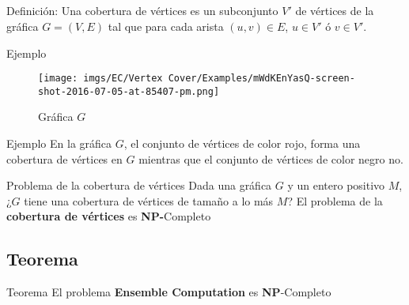 \documentclass[spanish, xcolor=dvipsnames, aspectratio=169]{beamer}
\newcommand{\subsectiontitle}{}
\begin{document}
\subsection{\subsectiontitle}
\begin{frame}{\subsectiontitle}
Definición:
\newline
Una cobertura de vértices es un subconjunto \(V'\) de vértices de la gráfica \(G = \left(V, E\right) \) tal que para cada 
arista \( \left(u, v\right) \in E \), \(u \in V'\) ó \(v \in V'\).
\end{frame}
\begin{frame}{Ejemplo}
    \begin{figure}
        \centering
        \texttt{[image: imgs/EC/Vertex Cover/Examples/mWdKEnYasQ-screen-shot-2016-07-05-at-85407-pm.png]}
        \caption{Gráfica \( G \)}
    \end{figure}
\end{frame}
\begin{frame}{Ejemplo}
    En la gráfica \( G \), el conjunto de vértices de color rojo, forma una cobertura de vértices en \( G \) mientras que el conjunto de vértices de 
    color negro no.
\end{frame}
\begin{frame}{Problema de la cobertura de vértices}
    Dada una gráfica \(G\) y un entero positivo \(M\), ¿\(G\) tiene una cobertura de vértices de tamaño a lo más \(M\)?
    \newline 
    El problema de la \textbf{cobertura de vértices} es \textbf{NP-}Completo
\end{frame}

\renewcommand{\subsectiontitle}{Teorema}
\subsection{\subsectiontitle}
\begin{frame}{\subsectiontitle}
El problema \textbf{Ensemble Computation} es \textbf{NP}-Completo
\end{frame}
\renewcommand{\subsectiontitle}{Demostración}
\end{document}
